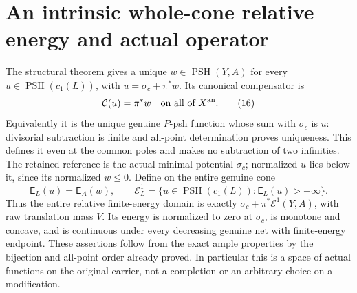 \documentclass[11pt]{article}
\newcommand{\PSH}{\operatorname{PSH}}
\begin{document}
\section{An intrinsic whole-cone relative energy and actual operator}
The structural theorem gives a unique $w\in\PSH(Y,A)$ for every
$u\in\PSH(c_1(L))$, with $u=\sigma_c+\pi^*w$.
Its canonical compensator is
\[
 \mathcal C(u)=\pi^*w\quad\hbox{on all of }X^{\rm an}.     \tag{16}
\]
Equivalently it is the unique genuine $P$-psh function whose sum
with $\sigma_c$ is $u$: divisorial subtraction is finite and
all-point determination proves uniqueness. This defines it even at
the common poles and makes no subtraction of two infinities.
The retained reference is the actual minimal potential $\sigma_c$;
normalized $u$ lies below it, since its normalized $w\leq0$.
Define on the entire genuine cone
\[
 \mathsf E_L(u)=\mathsf E_A(w),\qquad
 \mathcal E_L^1=\{u\in\PSH(c_1(L)):\mathsf E_L(u)>-\infty\}.
                                                               \tag{17}
\]
Thus the entire relative finite-energy domain is exactly
$\sigma_c+\pi^*\mathcal E^1(Y,A)$, with raw translation mass $V$.
Its energy is normalized to zero at $\sigma_c$, is monotone and
concave, and is continuous under every decreasing genuine net with
finite-energy endpoint. These assertions follow from the exact
ample properties by the bijection and all-point order already proved.
In particular this is a space of actual functions on the original
carrier, not a completion or an arbitrary choice on a modification.
\end{document}
